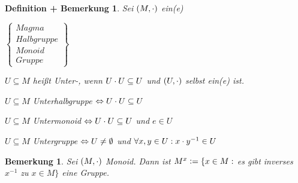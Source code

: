 \documentclass[a4paper,10pt,german]{scrbook}
\theoremstyle{saetze}
\theoremstyle{definitionen}
\newtheorem{DefBem}[Def]{Definition + Bemerkung}
\newtheorem{Bem}[Def]{Bemerkung}
\begin{document}
\begin{DefBem} 
    Sei $(M,\cdot)$ ein(e)
    \begin{small} $\left\{ \begin{array}{l}
            Magma \\
            Halbgruppe \\
            Monoid \\
            Gruppe \end{array}
    \right\}$
    \end{small}

    \begin{enum}
        \item $U \subseteq M$ heißt Unter-\bla, wenn $U \cdot U \subseteq U$ und
        $(U,\cdot)$ selbst ein(e) \bla ist.
        
        \item $U \subseteq M$ Unterhalbgruppe $\Leftrightarrow U \cdot U \subseteq
        U$
        
        \item $U \subseteq M$ Untermonoid $\Leftrightarrow U \cdot U \subseteq U$ und $e \in
        U$
        
        \item $U \subseteq M$ Untergruppe $\Leftrightarrow U \neq \emptyset$ und $\forall
        x,y \in U: x \cdot y^{-1} \in U$
    \end{enum}
\end{DefBem}

\begin{Bem} 
    Sei $ (M,\cdot)$ Monoid. Dann ist $M^x \mathrel{\mathop:}= \{x \in M:$ es gibt inverses
    $x^{-1}$ zu $x \in M\}$ eine Gruppe.
\end{Bem}
\end{document}
